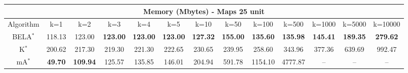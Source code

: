 \begin{tabular}{c|cccccccccccc}\toprule
\multicolumn{13}{c}{Memory (Mbytes) - Maps 25 unit}\\ \midrule
Algorithm & k=1 & k=2 & k=3 & k=4 & k=5 & k=10 & k=50 & k=100 & k=500 & k=1000 & k=5000 & k=10000 \\ \midrule
BELA$^*$ & 118.13 & 123.00 & \textbf{123.00} & \textbf{123.00} & \textbf{123.00} & \textbf{127.32} & \textbf{155.00} & \textbf{135.60} & \textbf{135.98} & \textbf{145.41} & \textbf{189.35} & \textbf{279.62} \\
K$^*$ & 200.62 & 217.30 & 219.30 & 221.30 & 222.65 & 230.65 & 239.95 & 258.60 & 343.96 & 377.36 & 639.69 & 992.47 \\
mA$^*$ & \textbf{49.70} & \textbf{109.94} & 125.57 & 135.85 & 146.01 & 204.94 & 591.78 & 1154.10 & 4777.87 & -- & -- & -- \\ \bottomrule 
\end{tabular}
